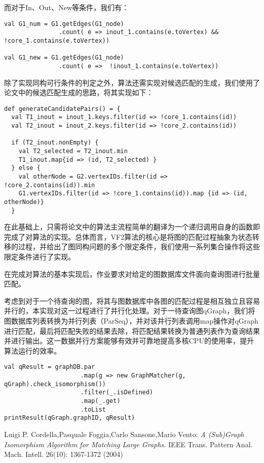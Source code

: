 \documentclass{article}
\begin{document}
而对于In、Out、New等条件，我们有：

\begin{lstlisting}[style=mStyle]
val G1_num = G1.getEdges(G1_node)
               .count( e => inout_1.contains(e.toVertex) && !core_1.contains(e.toVertex))

val G1_new = G1.getEdges(G1_node)
               .count( e =>  !inout_1.contains(e.toVertex))
\end{lstlisting}

除了实现同构可行条件的判定之外，算法还需实现对候选匹配的生成，我们使用了论文中的候选匹配生成的思路，将其实现如下：

\begin{lstlisting}[style=mStyle]
def generateCandidatePairs() = {
  val T1_inout = inout_1.keys.filter(id => !core_1.contains(id))
  val T2_inout = inout_2.keys.filter(id => !core_2.contains(id))

  if (T2_inout.nonEmpty) {
    val T2_selected = T2_inout.min
    T1_inout.map{id => (id, T2_selected) }
  } else {
    val otherNode = G2.vertexIDs.filter(id => !core_2.contains(id)).min
    G1.vertexIDs.filter(id => !core_1.contains(id)).map {id => (id, otherNode)}
  }
\end{lstlisting}

在此基础上，只需将论文中的算法主流程简单的翻译为一个递归调用自身的函数即完成了对算法的实现。总体而言，VF2算法的核心是将图的匹配过程抽象为状态转移的过程，并给出了图同构问题的多个限定条件，我们使用一系列集合操作将这些限定条件进行了实现。


在完成对算法的基本实现后，作业要求对给定的图数据库文件面向查询图进行批量匹配。

考虑到对于一个待查询的图，将其与图数据库中各图的匹配过程是相互独立且容易并行的，本实现对这一过程进行了并行化处理。对于一待查询图qGraph，我们将图数据库列表转换为并行列表（ParSeq），并对该并行列表调用map操作对qGraph进行匹配，最后将匹配失败的结果去除，将匹配结果转换为普通列表作为查询结果并进行输出。这一数据并行方案能够有效并可靠地提高多核CPU的使用率，提升算法运行的效率。

\begin{lstlisting}[style=mStyle]
val qResult = graphDB.par
                     .map(g => new GraphMatcher(g, qGraph).check_isomorphism())
                     .filter(_.isDefined)
                     .map(_.get)
                     .toList
printResult(qGraph.graphID, qResult)
\end{lstlisting}

\begin{thebibliography}{9}

   Luigi P. Cordella,Pasquale Foggia,Carlo Sansone,Mario Vento: \emph{A (Sub)Graph Isomorphism Algorithm for Matching Large Graphs.} IEEE Trans. Pattern Anal. Mach. Intell. 26(10): 1367-1372 (2004)

\end{thebibliography}
\end{document}
